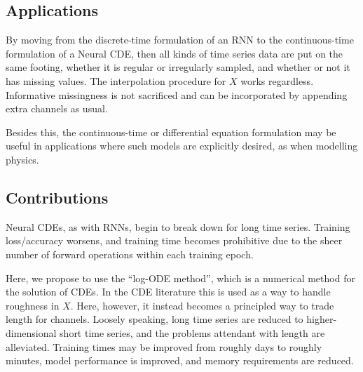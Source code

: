 
\subsection{Applications}
By moving from the discrete-time formulation of an RNN to the continuous-time formulation of a Neural CDE, then all kinds of time series data are put on the same footing, whether it is regular or irregularly sampled, and whether or not it has missing values. The interpolation procedure for $X$ works regardless. Informative missingness is not sacrificed and can be incorporated by appending extra channels as usual.

Besides this, the continuous-time or differential equation formulation may be useful in applications where such models are explicitly desired, as when modelling physics.


\subsection{Contributions}
Neural CDEs, as with RNNs, begin to break down for long time series. Training loss/accuracy worsens, and training time becomes prohibitive due to the sheer number of forward operations within each training epoch.

Here, we propose to use the ``log-ODE method'', which is a numerical method for the solution of CDEs. In the CDE literature this is used as a way to handle roughness in $X$. Here, however, it instead becomes a principled way to trade length for channels. Loosely speaking, long time series are reduced to higher-dimensional short time series, and the problems attendant with length are alleviated. Training times may be improved from roughly days to roughly minutes, model performance is improved, and memory requirements are reduced.

